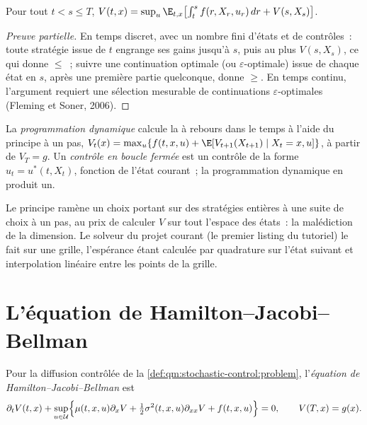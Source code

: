 \begin{theorem}\label{thm:qm:stochastic-control:dpp}
Pour tout $t < s \le T$, $V(t, x) = \sup_u\E_{t,x}\bigl[\int_t^sf(r, X_r, u_r)\,dr + V(s, X_s)\bigr]$.
\end{theorem}

\begin{proof}[Preuve partielle]
En temps discret, avec un nombre fini d'états et de contrôles~: toute stratégie issue de $t$ engrange ses gains jusqu'à
$s$, puis au plus $V(s, X_s)$, ce qui donne $\le$~; suivre une continuation optimale (ou $\varepsilon$-optimale)
issue de chaque état en $s$, après une première partie quelconque, donne $\ge$. En temps continu, l'argument
requiert une sélection mesurable de continuations $\varepsilon$-optimales (Fleming et Soner, 2006).
\end{proof}

\begin{definition}\label{def:qm:stochastic-control:dp}
La \emph{programmation dynamique} calcule la  à rebours dans le temps
à l'aide du principe à un pas, $V_t(x) = \max_u\{f(t, x, u) + \E[V_{t+1}(X_{t+1}) \mid X_t = x, u]\}$, à partir de $V_T =
g$. Un \emph{contrôle en boucle fermée} est un contrôle de la forme $u_t = u^*(t, X_t)$, fonction de
l'état courant~; la programmation dynamique en produit un.
\end{definition}

Le principe ramène un choix portant sur des stratégies entières à une suite de choix à un pas, au prix de
calculer $V$ sur tout l'espace des états~: la malédiction de la dimension. Le solveur du projet courant
(le premier listing du tutoriel) le fait sur une grille, l'espérance étant calculée par
quadrature sur l'état suivant et interpolation linéaire entre les points de la grille.

\section{L'équation de Hamilton--Jacobi--Bellman}

\begin{definition}\label{def:qm:stochastic-control:hjb}
Pour la diffusion contrôlée de la \cref{def:qm:stochastic-control:problem}, l'\emph{équation de
Hamilton--Jacobi--Bellman} est
\[
\partial_tV(t, x) + \sup_{u\in\mathcal U}\Bigl\{\mu(t, x, u)\partial_xV + \tfrac12\sigma^2(t, x, u)\partial_{xx}V + f(t, x,
u)\Bigr\} = 0, \qquad V(T, x) = g(x).
\]
\end{definition}

